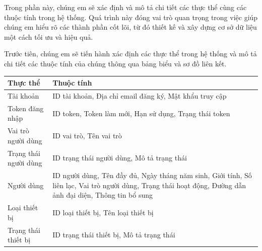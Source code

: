 Trong phần này, chúng em sẽ xác định và mô tả chi tiết các thực thể cùng các thuộc tính trong hệ thống.
Quá trình này đóng vai trò quan trọng trong việc giúp chúng em hiểu rõ các thành phần cốt lõi, từ đó thiết kế và xây dựng cơ sở dữ liệu một cách tối ưu và hiệu quả.

Trước tiên, chúng em sẽ tiến hành xác định các thực thể trong hệ thống và mô tả chi tiết các thuộc tính của chúng thông qua bảng biểu và sơ đồ liên kết.

\begin{table}[H]
	\raggedright
	\begin{tabularx}{\textwidth}{|p{4.5cm}|X|}
		\hline
		\bfseries Thực thể                & \bfseries Thuộc tính                                                                                                    \\ \hline
		Tài khoản                         &
		ID tài khoản, Địa chỉ email đăng ký, Mật khẩu truy cập                                                                                                      \\
		\hline
		Token đăng nhập                   &
		ID token, Token làm mới, Hạn sử dụng, Trạng thái token                                                                                                      \\
		\hline
		Vai trò người dùng                &
		ID vai trò, Tên vai trò                                                                                                                                     \\
		\hline
		Trạng thái người dùng             &
		ID trạng thái người dùng, Mô tả trạng thái                                                                                                                  \\
		\hline
		Người dùng                        &
		ID người dùng, Tên đầy đủ, Ngày tháng năm sinh, Giới tính, Số liên lạc, Vai trò người dùng, Trạng thái hoạt động, Đường dẫn ảnh đại diện, Thông tin bổ sung \\
		\hline
		Loại thiết bị                     &
		ID loại thiết bị, Tên loại thiết bị                                                                                                                         \\
		\hline
		Trạng thái thiết bị               &
		ID trạng thái thiết bị, Mô tả trạng thái                                                                                                                    \\

\end{tabularx}
\end{table}
